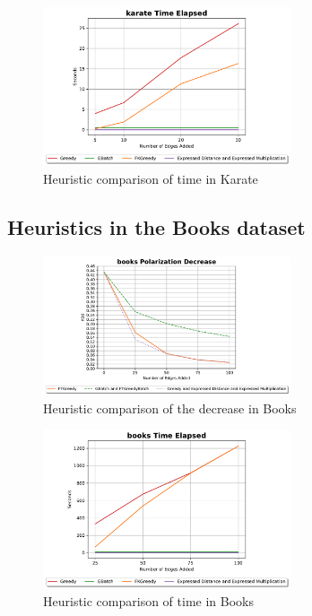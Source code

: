\begin{figure}[!htbp]
	\centering
	\includegraphics[width=0.65\textwidth]{Figures/Karate Time Elapsed}
	\caption{Heuristic comparison of time in Karate}
	\label{fig:karate_time}
\end{figure}

\clearpage

\subsection{Heuristics in the Books dataset}

\begin{figure}[!htbp]
	\centering
	\includegraphics[width=0.65\textwidth]{Figures/books Polarization Decrease}
	\caption{Heuristic comparison of the decrease in Books}
	\label{fig:books_pol}
\end{figure}


\begin{figure}[!htbp]
	\centering
	\includegraphics[width=0.65\textwidth]{Figures/books Time Elapsed}
	\caption{Heuristic comparison of time in Books}
	\label{fig:books_time}
\end{figure}


